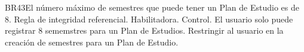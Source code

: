   
   \begin{BussinesRule}{BR43}{El número máximo de semestres que puede tener un Plan de Estudio es de 8.}
     \BRitem[Tipo:] Regla de integridad referencial.
     \BRitem[Clase:] Habilitadora.
     \BRitem[Nivel:] Control.
     \BRitem[Descripción:] El usuario solo puede registrar 8 sememstres para un Plan de Estudios.
     \BRitem[Motivación:] Restringir al usuario en la creación de semestres para un Plan de Estudio.
  \end{BussinesRule}
